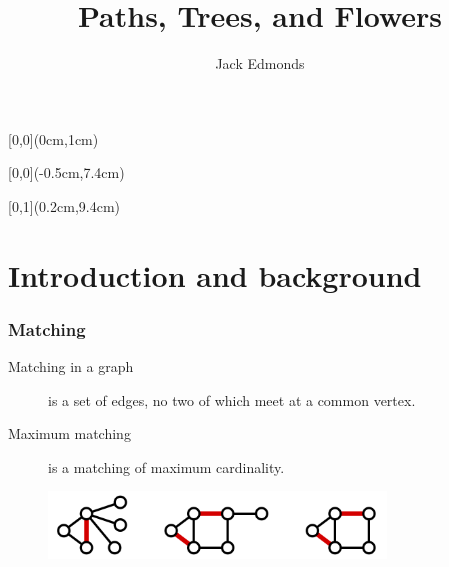 \documentclass[hyperref={pdfpagelabels=false}]{beamer}
\title{Paths, Trees, and Flowers}
\author{Jack Edmonds}
\institute{ETH Zurich -- Distributed Computing Group -- www.disco.ethz.ch}
\begin{document}
{
\begin{frame}
	\begin{textblock*}{\paperwidth}[0,0](0cm,1cm)
		\begin{center}
			\textbf{\huge \inserttitle}
		\end{center}
	\end{textblock*}
	\begin{textblock*}{\paperwidth}[0,0](-0.5cm,7.4cm)
		\flushright
		\color{white}
		\itshape \insertauthor
	\end{textblock*}
	\begin{textblock*}{\paperwidth}[0,1](0.2cm,9.4cm)
		\flushleft
		\tiny \itshape \insertinstitute
	\end{textblock*}
\end{frame}
}

\frame{\tableofcontents}

\section{Introduction and background}
\frame
{
	\frametitle{Matching}
	
	\begin{description}
		\item[Matching in a graph] is a set of edges, no two of which meet at a common vertex.
		\item[Maximum matching] is a matching of maximum cardinality.
	\end{description}
	\begin{figure}[htb]
	\centering
	\includegraphics[width=0.8\textwidth]{figures/matching.png}
	\end{figure}
}
\end{document}
